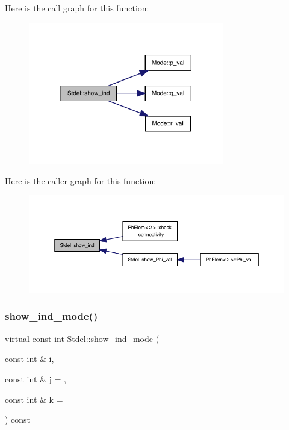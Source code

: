 Here is the call graph for this function\+:
\nopagebreak
\begin{figure}[H]
\begin{center}
\leavevmode
\includegraphics[width=242pt]{classStdel_a20afd536025caf1aad1c4e3f41fcb866_cgraph}
\end{center}
\end{figure}
Here is the caller graph for this function\+:
\nopagebreak
\begin{figure}[H]
\begin{center}
\leavevmode
\includegraphics[width=350pt]{classStdel_a20afd536025caf1aad1c4e3f41fcb866_icgraph}
\end{center}
\end{figure}
\mbox{\label{classStdel_aa97cf7534697be1f2e02ff540ed7433b}} 
\subsubsection{\texorpdfstring{show\+\_\+ind\+\_\+mode()}{show\_ind\_mode()}}
{\footnotesize\ttfamily virtual const int Stdel\+::show\+\_\+ind\+\_\+mode (\begin{DoxyParamCaption}\item[{const int \&}]{i,  }\item[{const int \&}]{j = {},  }\item[{const int \&}]{k = {} }\end{DoxyParamCaption}) const\hspace{0.3cm}{\ttfamily [pure virtual]}}



